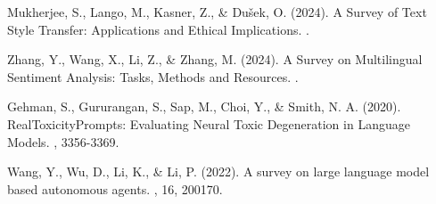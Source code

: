 \documentclass[11pt]{article}
\begin{document}

\begin{thebibliography}{4}
Mukherjee, S., Lango, M., Kasner, Z., \& Dušek, O. (2024).
\newblock A Survey of Text Style Transfer: Applications and Ethical Implications.
.

Zhang, Y., Wang, X., Li, Z., \& Zhang, M. (2024).
\newblock A Survey on Multilingual Sentiment Analysis: Tasks, Methods and Resources.
.

Gehman, S., Gururangan, S., Sap, M., Choi, Y., \& Smith, N. A. (2020).
\newblock RealToxicityPrompts: Evaluating Neural Toxic Degeneration in Language Models.
, 3356-3369.

Wang, Y., Wu, D., Li, K., \& Li, P. (2022).
\newblock A survey on large language model based autonomous agents.
, 16, 200170.
\end{thebibliography}
\end{document}
